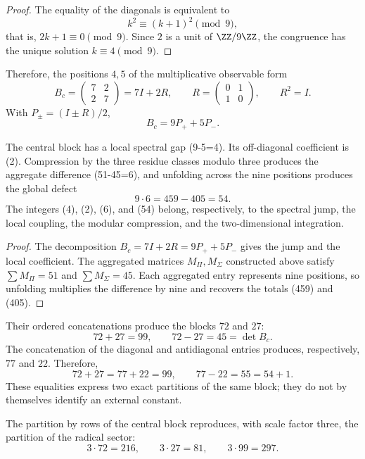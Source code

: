 \begin{proof}
The equality of the diagonals is equivalent to
\[
k^2\equiv(k+1)^2\pmod9,
\]
that is, \(2k+1\equiv0\pmod9\). Since \(2\) is a unit of
\(\ZZ/9\ZZ\), the congruence has the unique solution \(k\equiv4\pmod9\).
\end{proof}

Therefore, the positions \(4,5\) of the multiplicative observable form
\[
B_c=
\begin{pmatrix}7&2\\2&7\end{pmatrix}
=7I+2R,
\qquad
R=\begin{pmatrix}0&1\\1&0\end{pmatrix},
\qquad R^2=I.
\]
With \(P_\pm=(I\pm R)/2\),
\[
B_c=9P_++5P_-.
\]
\begin{theorem}
\label{thm:app-jerarquia-cuatro-dos-seis-cincuentaycuatro}
The central block has a local spectral gap (9-5=4). Its
off-diagonal coefficient is (2). Compression by the three residue classes modulo three
produces the aggregate difference (51-45=6), and unfolding across the nine
positions produces the global defect
\[
 9\cdot6=459-405=54.
\]
The integers (4), (2), (6), and (54) belong, respectively, to the
spectral jump, the local coupling, the modular compression, and the
two-dimensional integration.
\end{theorem}

\begin{proof}
The decomposition \(B_c=7I+2R=9P_++5P_-\) gives the jump and the
local coefficient. The aggregated matrices \(M_\Pi,M_\Sigma\) constructed
above satisfy
\(\sum M_\Pi=51\) and \(\sum M_\Sigma=45\). Each aggregated entry represents
nine positions, so unfolding multiplies the difference by
nine and recovers the totals (459) and (405).
\end{proof}
Their ordered concatenations produce the blocks \(72\) and \(27\):
\[
72+27=99,
\qquad
72-27=45=\det B_c.
\]
The concatenation of the diagonal and antidiagonal entries produces,
respectively, \(77\) and \(22\). Therefore,
\[
 72+27=77+22=99,\qquad
 77-22=55=54+1.
\]
These equalities express two exact partitions of the same block; they do not
by themselves identify an external constant.

\begin{proposition}
\label{prop:app-local-global-radical}
The partition by rows of the central block reproduces, with scale factor
three, the partition of the radical sector:
\[
 3\cdot72=216,\qquad
 3\cdot27=81,\qquad
 3\cdot99=297.
\]
\end{proposition}

